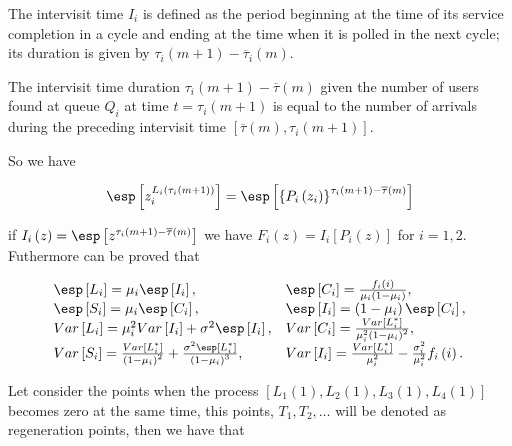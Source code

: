 \begin{Def}
The intervisit time $I_{i}$ is defined as the period beginning at the time of its service completion in a cycle and ending at the time when it is polled in the next cycle; its duration is given by $\tau_{i}\left(m+1\right)-\overline{\tau}_{i}\left(m\right)$.
\end{Def}

The intervisit time duration $\tau_{i}\left(m+1\right)-\overline{\tau}\left(m\right)$ given the number of users found at queue $Q_{i}$ at time $t=\tau_{i}\left(m+1\right)$ is equal to the number of arrivals during the preceding intervisit time $\left[\overline{\tau}\left(m\right),\tau_{i}\left(m+1\right)\right]$. 

So we have



\begin{eqnarray*}
\esp\left[z_{i}^{L_{i}\left(\tau_{i}\left(m+1\right)\right)}\right]=\esp\left[\left\{P_{i}\left(z_{i}\right)\right\}^{\tau_{i}\left(m+1\right)-\overline{\tau}\left(m\right)}\right]
\end{eqnarray*}

if $I_{i}\left(z\right)=\esp\left[z^{\tau_{i}\left(m+1\right)-\overline{\tau}\left(m\right)}\right]$
we have $F_{i}\left(z\right)=I_{i}\left[P_{i}\left(z\right)\right]$
for $i=1,2$. Futhermore can be proved that

\begin{eqnarray}
\begin{array}{ll}
\esp\left[L_{i}\right]=\mu_{i}\esp\left[I_{i}\right], &
\esp\left[C_{i}\right]=\frac{f_{i}\left(i\right)}{\mu_{i}\left(1-\mu_{i}\right)},\\
\esp\left[S_{i}\right]=\mu_{i}\esp\left[C_{i}\right],&
\esp\left[I_{i}\right]=\left(1-\mu_{i}\right)\esp\left[C_{i}\right],\\
Var\left[L_{i}\right]= \mu_{i}^{2}Var\left[I_{i}\right]+\sigma^{2}\esp\left[I_{i}\right],& 
Var\left[C_{i}\right]=\frac{Var\left[L_{i}^{*}\right]}{\mu_{i}^{2}\left(1-\mu_{i}\right)^{2}},\\
Var\left[S_{i}\right]= \frac{Var\left[L_{i}^{*}\right]}{\left(1-\mu_{i}\right)^{2}}+\frac{\sigma^{2}\esp\left[L_{i}^{*}\right]}{\left(1-\mu_{i}\right)^{3}},&
Var\left[I_{i}\right]= \frac{Var\left[L_{i}^{*}\right]}{\mu_{i}^{2}}-\frac{\sigma_{i}^{2}}{\mu_{i}^{2}}f_{i}\left(i\right).
\end{array}
\end{eqnarray}

Let consider the points when the process $\left[L_{1}\left(1\right),L_{2}\left(1\right),L_{3}\left(1\right),L_{4}\left(1\right)
\right]$ becomes zero at the same time, this points, $T_{1},T_{2},\ldots$ will be denoted as regeneration points, then we have that

